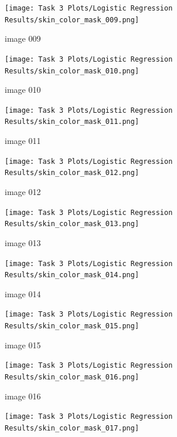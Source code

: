 \documentclass[11pt]{report}
\begin{document}
\begin{figure}
\begin{subfigure}{0.24\textwidth}
        \centering
        \texttt{[image: Task 3 Plots/Logistic Regression Results/skin\_color\_mask\_009.png]}
        \caption{image 009}
        \label{fig:lskincolormask9}
    \end{subfigure}
    \begin{subfigure}{0.24\textwidth}
        \centering
        \texttt{[image: Task 3 Plots/Logistic Regression Results/skin\_color\_mask\_010.png]}
        \caption{image 010}
        \label{fig:lskincolormask10}
    \end{subfigure}
    \begin{subfigure}{0.24\textwidth}
        \centering
        \texttt{[image: Task 3 Plots/Logistic Regression Results/skin\_color\_mask\_011.png]}
        \caption{image 011}
        \label{fig:lskincolormask11}
    \end{subfigure}
    \begin{subfigure}{0.24\textwidth}
        \centering
        \texttt{[image: Task 3 Plots/Logistic Regression Results/skin\_color\_mask\_012.png]}
        \caption{image 012}
        \label{fig:lskincolormask12}
    \end{subfigure}
    \begin{subfigure}{0.24\textwidth}
        \centering
        \texttt{[image: Task 3 Plots/Logistic Regression Results/skin\_color\_mask\_013.png]}
        \caption{image 013}
        \label{fig:lskincolormask13}
    \end{subfigure}
    \begin{subfigure}{0.24\textwidth}
        \centering
        \texttt{[image: Task 3 Plots/Logistic Regression Results/skin\_color\_mask\_014.png]}
        \caption{image 014}
        \label{fig:lskincolormask14}
    \end{subfigure}
    \begin{subfigure}{0.24\textwidth}
        \centering
        \texttt{[image: Task 3 Plots/Logistic Regression Results/skin\_color\_mask\_015.png]}
        \caption{image 015}
        \label{fig:lskincolormask15}
    \end{subfigure}
    \begin{subfigure}{0.24\textwidth}
        \centering
        \texttt{[image: Task 3 Plots/Logistic Regression Results/skin\_color\_mask\_016.png]}
        \caption{image 016}
        \label{fig:lskincolormask16}
    \end{subfigure}
    \begin{subfigure}{0.24\textwidth}
        \centering
        \texttt{[image: Task 3 Plots/Logistic Regression Results/skin\_color\_mask\_017.png]}

\end{subfigure}
\end{figure}
\end{document}
